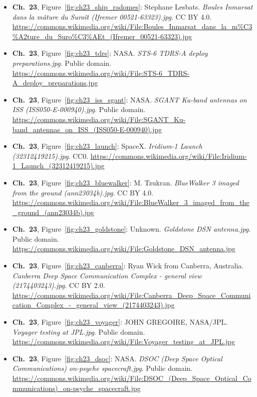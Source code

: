 \begin{small}
\begin{itemize}[leftmargin=0pt,itemsep=2pt,label={}]
\item \textbf{Ch.~23}, Figure~\ref{fig:ch23_ship_radomes}: Stephane Lesbats. \emph{Boules Inmarsat dans la mâture du Suroît (Ifremer 00521-\allowbreak{}63323).\allowbreak{}jpg}. CC BY 4.0. \url{https://commons.wikimedia.org/wiki/File:Boules_Inmarsat_dans_la_m%C3%A2ture_du_Suro%C3%AEt_(Ifremer_00521-63323).jpg}
\item \textbf{Ch.~23}, Figure~\ref{fig:ch23_tdrs}: NASA. \emph{STS-\allowbreak{}6 TDRS-\allowbreak{}A deploy preparations.\allowbreak{}jpg}. Public domain. \url{https://commons.wikimedia.org/wiki/File:STS-6_TDRS-A_deploy_preparations.jpg}
\item \textbf{Ch.~23}, Figure~\ref{fig:ch23_iss_sgant}: NASA. \emph{SGANT Ku-\allowbreak{}band antennas on ISS (ISS050-\allowbreak{}E-\allowbreak{}000940).\allowbreak{}jpg}. Public domain. \url{https://commons.wikimedia.org/wiki/File:SGANT_Ku-band_antennas_on_ISS_(ISS050-E-000940).jpg}
\item \textbf{Ch.~23}, Figure~\ref{fig:ch23_launch}: SpaceX. \emph{Iridium-\allowbreak{}1 Launch (32312419215).\allowbreak{}jpg}. CC0. \url{https://commons.wikimedia.org/wiki/File:Iridium-1_Launch_(32312419215).jpg}
\item \textbf{Ch.~23}, Figure~\ref{fig:ch23_bluewalker}: M. Tzukran. \emph{BlueWalker 3 imaged from the ground (ann23034b).\allowbreak{}jpg}. CC BY 4.0. \url{https://commons.wikimedia.org/wiki/File:BlueWalker_3_imaged_from_the_ground_(ann23034b).jpg}
\item \textbf{Ch.~23}, Figure~\ref{fig:ch23_goldstone}: Unknown. \emph{Goldstone DSN antenna.\allowbreak{}jpg}. Public domain. \url{https://commons.wikimedia.org/wiki/File:Goldstone_DSN_antenna.jpg}
\item \textbf{Ch.~23}, Figure~\ref{fig:ch23_canberra}: Ryan Wick from Canberra, Australia. \emph{Canberra Deep Space Communication Complex -\allowbreak{} general view (2174403243).\allowbreak{}jpg}. CC BY 2.0. \url{https://commons.wikimedia.org/wiki/File:Canberra_Deep_Space_Communication_Complex_-_general_view_(2174403243).jpg}
\item \textbf{Ch.~23}, Figure~\ref{fig:ch23_voyager}: JOHN GREGOIRE, NASA/JPL. \emph{Voyager testing at JPL.\allowbreak{}jpg}. Public domain. \url{https://commons.wikimedia.org/wiki/File:Voyager_testing_at_JPL.jpg}
\item \textbf{Ch.~23}, Figure~\ref{fig:ch23_dsoc}: NASA. \emph{DSOC (Deep Space Optical Communications) on-\allowbreak{}psyche spacecraft.\allowbreak{}jpg}. Public domain. \url{https://commons.wikimedia.org/wiki/File:DSOC_(Deep_Space_Optical_Communications)_on-psyche_spacecraft.jpg}

\end{itemize}
\end{small}
